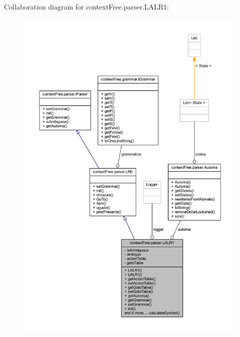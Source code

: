 Collaboration diagram for context\-Free.\-parser.\-L\-A\-L\-R1\-:\nopagebreak
\begin{figure}[H]
\begin{center}
\leavevmode
\includegraphics[width=350pt]{classcontext_free_1_1parser_1_1_l_a_l_r1__coll__graph}
\end{center}
\end{figure}
